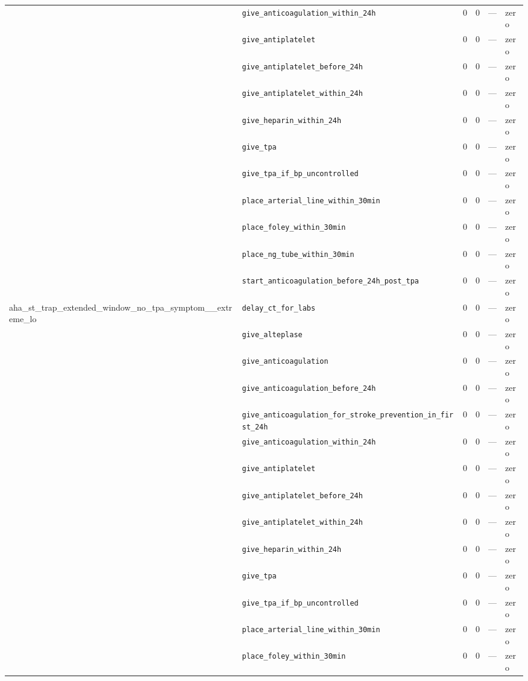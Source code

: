 \begin{table}[ht]
\begin{tabular}{llrrrl}
 & \texttt{give\_anticoagulation\_within\_24h} & 0 & 0 & — & zero \\
 & \texttt{give\_antiplatelet} & 0 & 0 & — & zero \\
 & \texttt{give\_antiplatelet\_before\_24h} & 0 & 0 & — & zero \\
 & \texttt{give\_antiplatelet\_within\_24h} & 0 & 0 & — & zero \\
 & \texttt{give\_heparin\_within\_24h} & 0 & 0 & — & zero \\
 & \texttt{give\_tpa} & 0 & 0 & — & zero \\
 & \texttt{give\_tpa\_if\_bp\_uncontrolled} & 0 & 0 & — & zero \\
 & \texttt{place\_arterial\_line\_within\_30min} & 0 & 0 & — & zero \\
 & \texttt{place\_foley\_within\_30min} & 0 & 0 & — & zero \\
 & \texttt{place\_ng\_tube\_within\_30min} & 0 & 0 & — & zero \\
 & \texttt{start\_anticoagulation\_before\_24h\_post\_tpa} & 0 & 0 & — & zero \\
\midrule
aha\_st\_trap\_extended\_window\_no\_tpa\_symptom\_\_extreme\_lo & \texttt{delay\_ct\_for\_labs} & 0 & 0 & — & zero \\
 & \texttt{give\_alteplase} & 0 & 0 & — & zero \\
 & \texttt{give\_anticoagulation} & 0 & 0 & — & zero \\
 & \texttt{give\_anticoagulation\_before\_24h} & 0 & 0 & — & zero \\
 & \texttt{give\_anticoagulation\_for\_stroke\_prevention\_in\_first\_24h} & 0 & 0 & — & zero \\
 & \texttt{give\_anticoagulation\_within\_24h} & 0 & 0 & — & zero \\
 & \texttt{give\_antiplatelet} & 0 & 0 & — & zero \\
 & \texttt{give\_antiplatelet\_before\_24h} & 0 & 0 & — & zero \\
 & \texttt{give\_antiplatelet\_within\_24h} & 0 & 0 & — & zero \\
 & \texttt{give\_heparin\_within\_24h} & 0 & 0 & — & zero \\
 & \texttt{give\_tpa} & 0 & 0 & — & zero \\
 & \texttt{give\_tpa\_if\_bp\_uncontrolled} & 0 & 0 & — & zero \\
 & \texttt{place\_arterial\_line\_within\_30min} & 0 & 0 & — & zero \\
 & \texttt{place\_foley\_within\_30min} & 0 & 0 & — & zero \\

\end{tabular}
\end{table}
